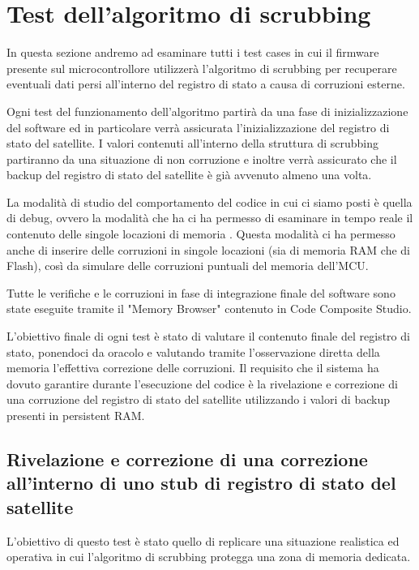 \documentclass[LaM,binding=0.6cm]{../sapthesis}
\begin{document}
\section{Test dell'algoritmo di scrubbing}

In questa sezione andremo ad esaminare tutti i test cases in cui il firmware presente sul microcontrollore utilizzerà l'algoritmo di scrubbing per recuperare eventuali dati persi all'interno del registro di stato a causa di corruzioni esterne.

Ogni test del funzionamento dell'algoritmo partirà da una fase di inizializzazione del software ed in particolare verrà assicurata l'inizializzazione del registro di stato del satellite. I valori contenuti all'interno della struttura di scrubbing partiranno da una situazione di non corruzione e inoltre verrà assicurato che il backup del registro di stato del satellite è già avvenuto almeno una volta.

La modalità di studio del comportamento del codice in cui ci siamo posti è quella di debug, ovvero la modalità che ha ci ha permesso di esaminare in tempo reale il contenuto delle singole locazioni di memoria .
Questa modalità ci ha permesso anche di inserire delle corruzioni in singole locazioni (sia di memoria RAM che di Flash), così da simulare delle corruzioni puntuali del memoria dell'MCU.

Tutte le verifiche e le corruzioni in fase di integrazione finale del software sono state eseguite tramite il "Memory Browser" contenuto in Code Composite Studio.

L'obiettivo finale di ogni test è stato di valutare il contenuto finale del registro di stato, ponendoci da oracolo e valutando tramite l'osservazione diretta della memoria l'effettiva correzione delle corruzioni.\newline\newline
Il requisito che il sistema ha dovuto garantire durante l'esecuzione del codice è la rivelazione e correzione di una corruzione del registro di stato del satellite utilizzando i valori di backup presenti in persistent RAM.

\subsection{Rivelazione e correzione di una correzione all'interno di uno stub di registro di stato del satellite}

L'obiettivo di questo test è stato quello di replicare una situazione realistica ed operativa in cui l'algoritmo di scrubbing protegga una zona di memoria dedicata. 
\end{document}
